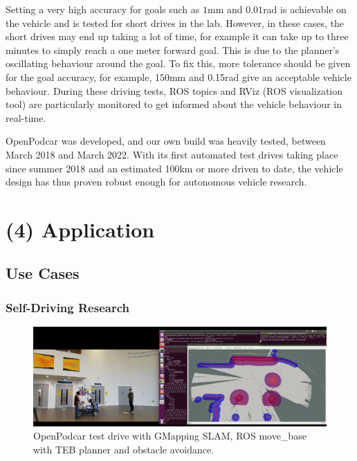 \documentclass[a4paper]{article}
\begin{document}
	Setting a very high accuracy for goals such as $1$mm and $0.01$rad is achievable on the vehicle and is tested for short drives in the lab. However, in these cases, the short drives may end up taking a lot of time, for example it can take up to three minutes to simply reach a one meter forward goal. This is due to the planner's oscillating behaviour around the goal. To fix this, more tolerance should be given for the goal accuracy, for example, 150mm and 0.15rad give an acceptable vehicle behaviour. During these driving tests, ROS topics and RViz (ROS visualization tool) are particularly monitored to get informed about the vehicle behaviour in real-time. 
	
	OpenPodcar was developed, and our own build was heavily tested, between March 2018 and March 2022. With its first automated test drives taking place since summer 2018 and an estimated 100km or more driven to date, the vehicle design has thus proven robust enough for autonomous vehicle research. 
	
	
	\section{(4) Application}\label{h.f78bi3oom0mu}
	
	\subsection{Use Cases}
	
	\subsubsection{Self-Driving  Research}\label{h.4q5g9edishy3}
	
	\begin{figure}
		\centering
		\includegraphics[width=\columnwidth]{software/move_base_collision_avoidance.png}
		\caption{OpenPodcar test drive with GMapping SLAM, ROS move\_base with TEB planner and obstacle avoidance.}
		\label{fig:testDrive_gmapping}
	\end{figure}
	
\end{document}
